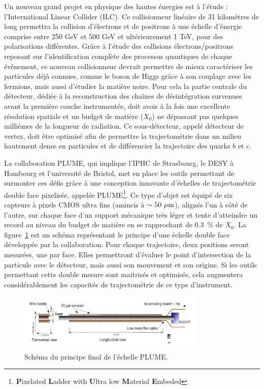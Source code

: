   Un nouveau grand projet en physique des hautes énergies est à l'étude : l'International Linear Collider (ILC). 
  Ce collisionneur linéaire de 31 kilomètres de long permettra la collision d'électrons et de positrons à une échelle d'énergie comprise entre 250 GeV et 500 GeV et ultérieurement 1 TeV, pour des polarisations différentes.
  Grâce à l'étude des collisions électrons/positrons reposant sur l'identification complète des processus quantiques de chaque évènement, ce nouveau collisionneur devrait permettre de mieux caractériser les particules déjà connues, comme le boson de Higgs grâce à son couplage avec les fermions, mais aussi d'étudier la matière noire.
  Pour cela la partie centrale du détecteur, dédiée à la reconstruction des chaînes de désintégration survenues avant la première couche instrumentée, doit avoir à la fois une excellente résolution spatiale et un budget de matière ($X_0$) ne dépassant pas quelques millièmes de la longueur de radiation. 
  Ce sous-détecteur, appelé détecteur de vertex, doit être optimisé afin de permettre la trajectométrie dans un milieu hautement dense en particules et de différencier la trajectoire des quarks $b$ et $c$.

  La collaboration PLUME, qui implique l'IPHC de Strasbourg, le DESY à Hambourg et l'université de Bristol, met en place les outils permettant de surmonter ces défis grâce à une conception innovante d'échelles de trajectométrie double face pixelisée, appelée PLUME\footnote{\textbf{P}ixelated \textbf{L}adder with \textbf{U}ltra low \textbf{M}aterial \textbf{E}mbeded}\cite{PLUME}. 
  Ce type d'objet est équipé de six capteurs à pixels CMOS ultra fins (amincis à $\sim 50~\mu\rm{m}$), alignés l'un à côté de l'autre, sur chaque face d'un support mécanique très léger et tente d'atteindre un record au niveau du budget de matière en se rapprochant de 0.3~\% de $X_0$.
  La figure~\ref{fig:PLUME} est un schéma représentant le principe d'une échelle double face développée par la collaboration.
  Pour chaque trajectoire, deux positions seront mesurées, une par face. 
  Elles permettront d'évaluer le point d'intersection de la particule avec le détecteur, mais aussi son mouvement et son origine. 
  Si les outils permettant cette double mesure sont maitrisés et optimisés, cela augmentera considérablement les capacités de trajectométrie de ce type d'instrument.

  \begin{figure}
    \centering
    \includegraphics[width = 0.8\textwidth]{Pictures/vxd/plume_finalGoal.png}
    \caption{Schéma du principe final de l'échelle PLUME.}
    \label{fig:PLUME}
  \end{figure}

